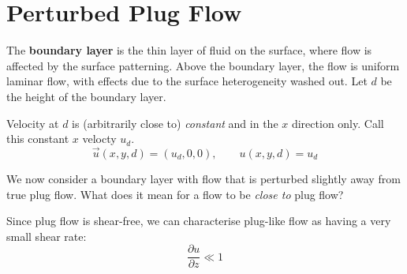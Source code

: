 \documentclass[12pt, a4paper, twoside, openright]{book}
\begin{document}
\begin{center}
\end{center}


\section*{Perturbed Plug Flow}

The \textbf{boundary layer} is the thin layer of fluid on the surface, where flow is affected by the surface patterning.  Above the boundary layer, the flow is uniform laminar flow, with effects due to the surface heterogeneity washed out.
Let $d$ be the height of the boundary layer.

Velocity at $d$ is (arbitrarily close to) \emph{constant} and in the $x$ direction only.  Call this constant $x$ velocty $u_d$.
\begin{equation}
\vec{u}(x,y,d) = (u_d,0,0), \qquad u(x,y,d) = u_d
\end{equation}

\vspace{1em}

We now consider a boundary layer with flow that is perturbed slightly away from true plug flow.  What does it mean for a flow to be \emph{close to} plug flow?

Since plug flow is shear-free, we can characterise plug-like flow as having a very small shear rate:
\begin{equation}
\frac{\partial u}{\partial z} \ll 1
\end{equation}

\vspace{1em}

\begin{center}
\end{center}
\end{document}
